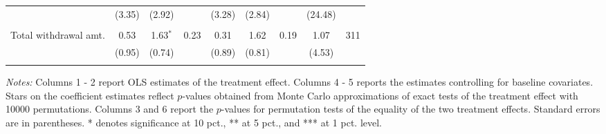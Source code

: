 \begin{table}[h]
{\begin{threeparttable}
\begin{tabular}{l*{8}{c}}
          &   (3.35)&   (2.92)&         &   (3.28)&   (2.84)&         &  (24.48)&         \\
          &         &         &         &         &         &         &         &         \\
Total withdrawal amt.&     0.53&1.63$^{*}$&     0.23&     0.31&     1.62&     0.19&     1.07&      311\\
          &   (0.95)&   (0.74)&         &   (0.89)&   (0.81)&         &   (4.53)&         \\
          &         &         &         &         &         &         &         &         \\
\bottomrule \end{tabular} \begin{tablenotes}[flushleft] \footnotesize \item \emph{Notes:} Columns 1 - 2 report OLS estimates of the treatment effect. Columns 4 - 5 reports the estimates controlling for baseline covariates. Stars on the coefficient estimates reflect \(p\)-values obtained from Monte Carlo approximations of exact tests of the treatment effect with 10000 permutations. Columns 3 and 6 report the \(p\)-values for permutation tests of the equality of the two treatment effects. Standard errors are in parentheses. * denotes significance at 10 pct., ** at 5 pct., and *** at 1 pct. level. \end{tablenotes} \end{threeparttable} } \end{table}

